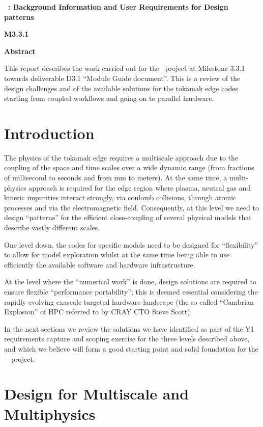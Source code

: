 \documentclass{article}
\begin{document}
{\huge{}{ \textbf{\nep \  : Background Information and User Requirements 
for Design patterns}}}

{\huge{}{ \textbf{M3.3.1}}}

\baselineskip=12pt
\textbf{Abstract}

This report describes the work carried out for the \nep \   project at Milestone 3.3.1 
towards deliverable D3.1 ``Module Guide document''. This is a review of the design 
challenges and of the available solutions for the tokamak edge codes 
starting from coupled workflows and going on to parallel hardware. 
\pagebreak


\section{Introduction}

The physics of the tokamak edge requires a multiscale approach due to the coupling 
of the space and time scales over a wide dynamic range (from fractions of millisecond 
to seconds and from mm to meters). At the same 
time, a multi-physics approach is required for the edge region where plasma, neutral 
gas and kinetic impurities interact strongly, via coulomb collisions, through atomic 
processes and via the electromagnetic field. Consequently, at this level we need 
to design ``patterns'' for the efficient close-coupling of several physical models 
that describe vastly different scales.

One level down, the codes for specific models need to be designed for ``flexibility'' 
to allow for model exploration whilst at the same time being able to use efficiently 
the available software and hardware infrastructure.

At the level where the ``numerical work'' is done, design solutions are required 
to ensure flexible ``performance portability''; this is deemed essential considering 
the rapidly evolving exascale targeted hardware landscape (the so called ``Cambrian 
Explosion'' of HPC referred to by CRAY CTO Steve Scott).

In the next sections we review the solutions we have identified as part of the 
Y1 requirements capture and scoping exercise for the three levels described above, 
and which we believe will form a good starting point and solid foundation for the 
\exc \   \nep \   project.

\section{Design for Multiscale and Multiphysics}
\end{document}
